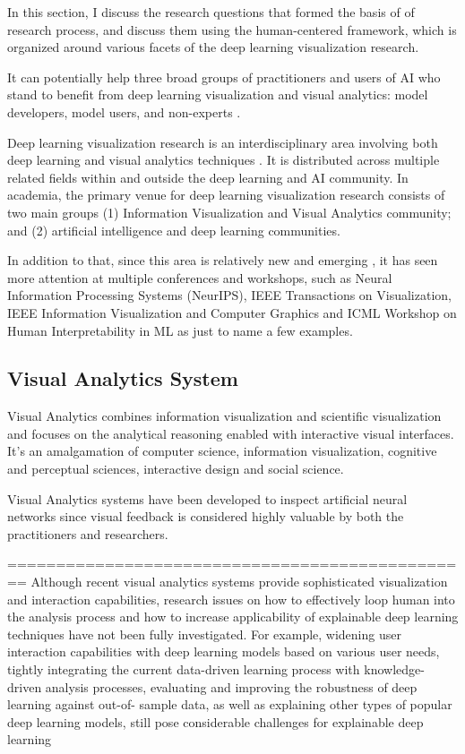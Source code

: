 In this section, I discuss the research questions that formed the basis of of research process, and discuss them using the human-centered framework, which is organized around various facets of the deep learning visualization research.



It can potentially help three broad groups of practitioners and users of AI who stand to benefit from deep learning visualization and visual analytics: model developers, model users, and non-experts \cite{Choo2018}.

Deep learning visualization research is an interdisciplinary area involving both deep learning and visual analytics techniques \cite{Choo2018}. It is distributed across multiple related fields within and outside the deep learning and AI community. In academia, the primary venue for deep learning visualization research consists of two main groups (1) Information Visualization and Visual Analytics community; and (2) artificial intelligence and deep learning communities. 

In addition to that, since this area is relatively new and emerging \cite{Choo2018}, it has seen more attention at multiple conferences and workshops, such as Neural Information Processing Systems (NeurIPS), IEEE Transactions on Visualization, IEEE Information Visualization and Computer Graphics and ICML Workshop on Human Interpretability in ML as just to name a few examples.

\subsection{Visual Analytics System}
    
Visual Analytics combines information visualization and scientific visualization and focuses on the analytical reasoning enabled with interactive visual interfaces. It’s an amalgamation of computer science, information visualization, cognitive and perceptual sciences, interactive design and social science.

Visual Analytics systems have been developed to inspect artificial neural networks since visual feedback is considered highly valuable by both the practitioners and researchers.

================================================
Although recent visual analytics systems provide sophisticated visualization and interaction capabilities, research issues on how to effectively loop human into the analysis process and how to increase applicability of explainable deep learning techniques have not been fully investigated. For example, widening user interaction capabilities with deep learning models based on various user needs, tightly integrating the current data-driven learning process with knowledge-driven analysis processes, evaluating and improving the robustness of deep learning against out-of- sample data, as well as explaining other types of popular deep learning models, still pose considerable challenges for explainable deep learning

